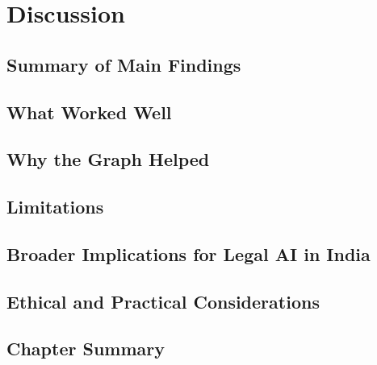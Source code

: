 \chapter{Discussion}

\section{Summary of Main Findings}
\section{What Worked Well}
\section{Why the Graph Helped}
\section{Limitations}
\section{Broader Implications for Legal AI in India}
\section{Ethical and Practical Considerations}
\section{Chapter Summary}
